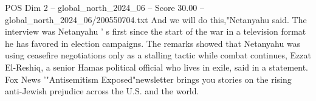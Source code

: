 \begin{textsample}{POS Dim 2 – global\_north\_2024\_06 – Score 30.00 – global\_north\_2024\_06/200550704.txt}
And we will do this,"Netanyahu said.
The interview was Netanyahu ' s first since the start of the war in a television format he has favored in election campaigns.
The remarks showed that Netanyahu was using ceasefire negotiations only as a stalling tactic while combat continues, Ezzat El-Reshiq, a senior Hamas political official who lives in exile, said in a statement.
Fox News '"Antisemitism Exposed"newsletter brings you stories on the rising anti-Jewish prejudice across the U.S. and the world.

\end{textsample}

